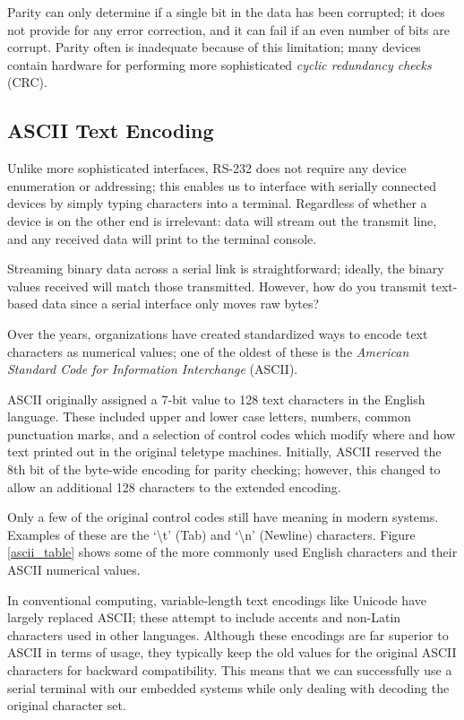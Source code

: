 \documentclass[openany,11pt,fleqn]{book} %
\begin{document}
Parity can only determine if a single bit in the data has been corrupted; it does not provide for any error correction, and it can fail if an even number of bits are corrupt. Parity often is inadequate because of this limitation; many devices contain hardware for performing more sophisticated \textit{cyclic redundancy checks} (CRC).  


\subsection{ASCII Text Encoding}

Unlike more sophisticated interfaces, RS-232 does not require any device enumeration or addressing; this enables us to interface with serially connected devices by simply typing characters into a terminal. Regardless of whether a device is on the other end is irrelevant: data will stream out the transmit line, and any received data will print to the terminal console.  

Streaming binary data across a serial link is straightforward; ideally, the binary values received will match those transmitted. However, how do you transmit text-based data since a serial interface only moves raw bytes?

Over the years, organizations have created standardized ways to encode text characters as numerical values; one of the oldest of these is the \textit{American Standard Code for Information Interchange} (ASCII). 

ASCII originally assigned a 7-bit value to 128 text characters in the English language. These included upper and lower case letters, numbers, common punctuation marks, and a selection of control codes which modify where and how text printed out in the original teletype machines. Initially, ASCII reserved the 8th bit of the byte-wide encoding for parity checking; however, this changed to allow an additional 128 characters to the extended encoding. 

Only a few of the original control codes still have meaning in modern systems. Examples of these are the `\textbackslash{}t' (Tab) and `\textbackslash{}n' (Newline) characters. Figure \ref{ascii_table} shows some of the more commonly used English characters and their ASCII numerical values.  

In conventional computing, variable-length text encodings like Unicode have largely replaced ASCII; these attempt to include accents and non-Latin characters used in other languages. Although these encodings are far superior to ASCII in terms of usage, they typically keep the old values for the original ASCII characters for backward compatibility. This means that we can successfully use a serial terminal with our embedded systems while only dealing with decoding the original character set.
\end{document}
